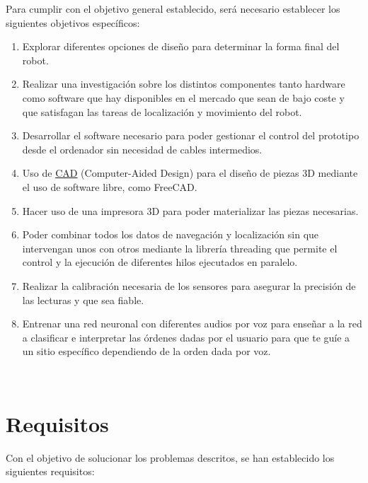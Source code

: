 Para cumplir con el objetivo general establecido, será necesario establecer los siguientes objetivos específicos:


\begin{enumerate}
 \item Explorar diferentes opciones de diseño para determinar la forma final del robot.
 \item Realizar una investigación sobre los distintos componentes tanto hardware como software que hay disponibles en el mercado que sean 
de bajo coste y que satisfagan las tareas de localización y movimiento del robot.
 \item Desarrollar el software necesario para poder gestionar el control del prototipo desde el ordenador sin necesidad de cables intermedios.
 \item Uso de \hyperlink{CAD}{CAD} (Computer-Aided Design) para el diseño de piezas 3D mediante el uso de software libre, como FreeCAD.
 \item Hacer uso de una impresora 3D para poder materializar las piezas necesarias. 
 \item Poder combinar todos los datos de navegación y localización sin que intervengan unos con otros mediante la librería threading que permite el control y la ejecución de diferentes hilos ejecutados en paralelo.
 \item Realizar la calibración necesaria de los sensores para asegurar la precisión de las lecturas y que sea fiable.
 \item Entrenar una red neuronal con diferentes audios por voz para enseñar a la red a clasificar e interpretar las órdenes dadas por el usuario para
 que te guíe a un sitio específico dependiendo de la orden dada por voz.
\end{enumerate}\


\section{Requisitos}
\label{sec:requisitos}

Con el objetivo de solucionar los problemas descritos, se han establecido los siguientes requisitos:

